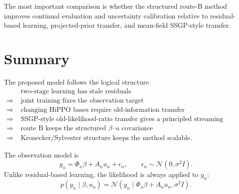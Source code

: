 \documentclass[12pt]{article}
\begin{document}
The most important comparison is whether the structured route-B method improves
continual evaluation and uncertainty calibration relative to residual-based learning,
projected-prior transfer, and mean-field SSGP-style transfer.


\section{Summary}
\label{sec:summary}

The proposed model follows the logical structure
\begin{equation}
\begin{aligned}
    &\text{two-stage learning has stale residuals} \\
    \Rightarrow\;&
    \text{joint training fixes the observation target} \\
    \Rightarrow\;&
    \text{changing HiPPO bases require old-information transfer} \\
    \Rightarrow\;&
    \text{SSGP-style old-likelihood-ratio transfer gives a principled streaming update} \\
    \Rightarrow\;&
    \text{route B keeps the structured }\beta\text{--}u\text{ covariance} \\
    \Rightarrow\;&
    \text{Kronecker/Sylvester structure keeps the method scalable.}
\end{aligned}
\end{equation}

The observation model is
\begin{equation}
    y_n=\Phi_n\beta+A_nu_n+\epsilon_n,
    \qquad
    \epsilon_n\sim\mathcal{N}(0,\sigma^2I).
\end{equation}
Unlike residual-based learning, the likelihood is always applied to $y_n$:
\begin{equation}
    p(y_n\mid \beta,u_n)
    =
    \mathcal{N}(y_n\mid \Phi_n\beta+A_nu_n,\sigma^2I).
\end{equation}
\end{document}
